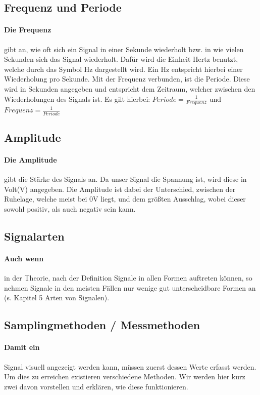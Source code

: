 \documentclass{article}
\begin{document}
\subsection{Frequenz und Periode}
\paragraph{Die Frequenz}
gibt an, wie oft sich ein Signal in einer Sekunde wiederholt bzw. in wie vielen Sekunden sich das Signal wiederholt. Dafür wird die Einheit Hertz benutzt, welche durch das Symbol Hz dargestellt wird. Ein Hz entspricht hierbei einer Wiederholung pro Sekunde. 
Mit der Frequenz verbunden, ist die Periode. Diese wird in Sekunden angegeben und entspricht dem Zeitraum, welcher zwischen den Wiederholungen des Signals ist.
Es gilt hierbei:
$Periode=\displaystyle\frac{1}{Frequenz}$ 
und  
$Frequenz=\displaystyle\frac{1}{Periode}$

\subsection{Amplitude}
\paragraph{Die Amplitude}
gibt die Stärke des Signals an. Da unser Signal die Spannung ist, wird diese in Volt(V) angegeben. Die Amplitude ist dabei der Unterschied, zwischen der Ruhelage, welche meist bei 0V liegt, und dem größten Ausschlag, wobei dieser sowohl positiv, als auch negativ sein kann.

\subsection{Signalarten}
\paragraph{Auch wenn}
in der Theorie, nach der Definition Signale in allen Formen auftreten können, so nehmen Signale in den meisten Fällen nur wenige gut unterscheidbare Formen an (s. Kapitel 5 Arten von Signalen).

\subsection{Samplingmethoden / Messmethoden}
\paragraph{Damit ein}
Signal visuell angezeigt werden kann, müssen zuerst dessen Werte erfasst werden. Um dies zu erreichen existieren verschiedene Methoden. Wir werden hier kurz zwei davon vorstellen und erklären, wie diese funktionieren.
\end{document}
